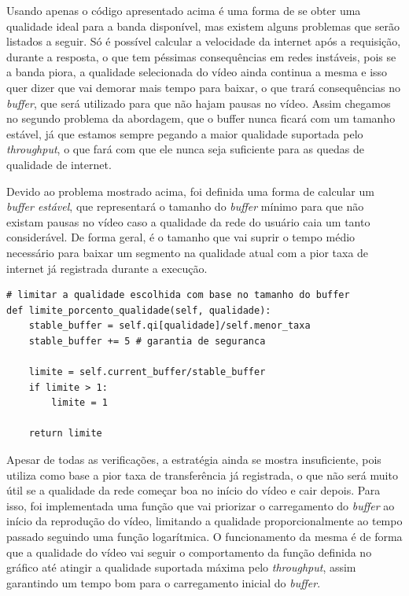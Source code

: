 \documentclass[12pt]{article}
\begin{document}
Usando apenas o código apresentado acima é uma forma de se obter uma qualidade ideal para a banda disponível, mas existem alguns problemas que serão listados a seguir. Só é possível calcular a velocidade da internet após a requisição, durante a resposta, o que tem péssimas consequências em redes instáveis, pois se a banda piora, a qualidade selecionada do vídeo ainda continua a mesma e isso quer dizer que vai demorar mais tempo para baixar, o que trará consequências no \textit{buffer}, que será utilizado para que não hajam pausas no vídeo. Assim chegamos no segundo problema da abordagem, que o buffer nunca ficará com um tamanho estável, já que estamos sempre pegando a maior qualidade suportada pelo \textit{throughput}, o que fará com que ele nunca seja suficiente para as quedas de qualidade de internet.

Devido ao problema mostrado acima, foi definida uma forma de calcular um \textit{buffer estável}, que representará o tamanho do \textit{buffer} mínimo para que não existam pausas no vídeo caso a qualidade da rede do usuário caia um tanto considerável. De forma geral, é o tamanho que vai suprir o tempo médio necessário para baixar um segmento na qualidade atual com a pior taxa de internet já registrada durante a execução.

\begin{lstlisting}
# limitar a qualidade escolhida com base no tamanho do buffer
def limite_porcento_qualidade(self, qualidade):
    stable_buffer = self.qi[qualidade]/self.menor_taxa
    stable_buffer += 5 # garantia de seguranca

    limite = self.current_buffer/stable_buffer
    if limite > 1:
        limite = 1

    return limite
\end{lstlisting}

Apesar de todas as verificações, a estratégia ainda se mostra insuficiente, pois utiliza como base a pior taxa de transferência já registrada, o que não será muito útil se a qualidade da rede começar boa no início do vídeo e cair depois. Para isso, foi implementada uma função que vai priorizar o carregamento do \textit{buffer} ao início da reprodução do vídeo, limitando a qualidade proporcionalmente ao tempo passado seguindo uma função logarítmica. O funcionamento da mesma é de forma que a qualidade do vídeo vai seguir o comportamento da função definida no gráfico até atingir a qualidade suportada máxima pelo \textit{throughput}, assim garantindo um tempo bom para o carregamento inicial do \textit{buffer}.
\end{document}
